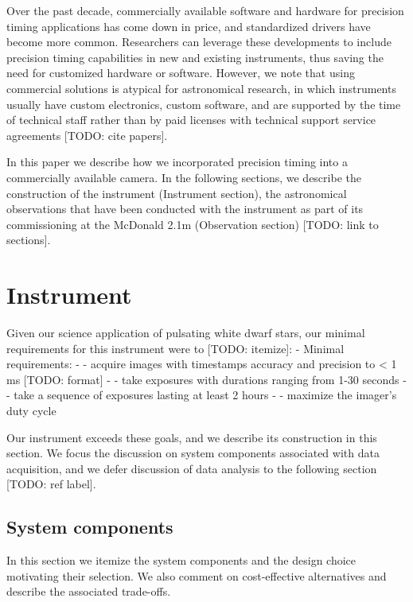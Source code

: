 \documentclass[preprint2]{aastex}
\begin{document}
Over the past decade, commercially available software and hardware for precision timing applications has come down in price, and standardized drivers have become more common. Researchers can leverage these developments to include precision timing capabilities in new and existing instruments, thus saving the need for customized hardware or software. However, we note that using commercial solutions is atypical for astronomical research, in which instruments usually have custom electronics, custom software, and are supported by the time of technical staff rather than by paid licenses with technical support service agreements [TODO: cite papers].

In this paper we describe how we incorporated precision timing into a commercially available camera. In the following sections, we describe the construction of the instrument (Instrument section), the astronomical observations that have been conducted with the instrument as part of its commissioning at the McDonald 2.1m (Observation section) [TODO: link to sections].

\section{Instrument}

Given our science application of pulsating white dwarf stars, our minimal requirements for this instrument were to [TODO: itemize]:
- Minimal requirements:
- - acquire images with timestamps accuracy and precision to  < 1 ms [TODO: format]
- - take exposures with durations ranging from 1-30 seconds
- - take a sequence of exposures lasting at least 2 hours
- - maximize the imager's duty cycle

Our instrument exceeds these goals, and we describe its construction in this section. We focus the discussion on system components associated with data acquisition, and we defer discussion of data analysis to the following section [TODO: ref label].

\subsection{System components}

In this section we itemize the system components and the design choice motivating their selection. We also comment on cost-effective alternatives and describe the associated trade-offs.
\end{document}
